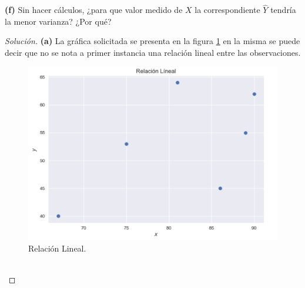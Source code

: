 \documentclass[10.5pt,notitlepage]{article}
\newenvironment{solucion}
  {\begin{proof}[Solución]}
  {\end{proof}}
\begin{document}
\noindent\textbf{(f)} Sin hacer cálculos, ¿para que valor medido de \(X\) la correspondiente \(\hat{Y}\) tendría la menor varianza? ¿Por qué?
\begin{solucion}
\noindent\textbf{(a)} La gráfica solicitada se presenta en la figura \ref{fig:RLineal} en la misma se puede decir que no se nota a primer instancia una relación lineal entre las observaciones.
  \begin{figure}[htb]
 \centering
 \includegraphics[scale = 0.6]{Relación lineal.png}
 \caption{Relación Lineal.}
 \label{fig:RLineal}
 \end{figure}\\



\end{solucion}
\end{document}
